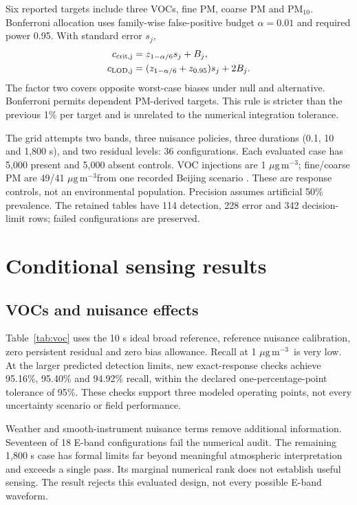 \documentclass[conference]{IEEEtran}
\newcommand{\ugm}{\ensuremath{\mu\mathrm{g\,m}^{-3}}}
\begin{document}
Six reported targets include three VOCs, fine PM, coarse PM and PM$_{10}$. Bonferroni allocation uses family-wise false-positive budget $\alpha=0.01$ and required power 0.95. With standard error $s_j$,
\begin{align}
c_{\rm crit,j}&=z_{1-\alpha/6}s_j+B_j,\\
c_{\rm LOD,j}&=(z_{1-\alpha/6}+z_{0.95})s_j+2B_j.
\end{align}
The factor two covers opposite worst-case biases under null and alternative. Bonferroni permits dependent PM-derived targets. This rule is stricter than the previous 1\% per target and is unrelated to the numerical integration tolerance.

The grid attempts two bands, three nuisance policies, three durations (0.1, 10 and 1,800 s), and two residual levels: 36 configurations. Each evaluated case has 5,000 present and 5,000 absent controls. VOC injections are 1 \ugm; fine/coarse PM are 49/41 \ugm from one recorded Beijing scenario \cite{beijing}. These are response controls, not an environmental population. Precision assumes artificial 50\% prevalence. The retained tables have 114 detection, 228 error and 342 decision-limit rows; failed configurations are preserved.

\section{Conditional sensing results}
\subsection{VOCs and nuisance effects}
Table~\ref{tab:voc} uses the 10 s ideal broad reference, reference nuisance calibration, zero persistent residual and zero bias allowance. Recall at 1 \ugm\ is very low. At the larger predicted detection limits, new exact-response checks achieve 95.16\%, 95.40\% and 94.92\% recall, within the declared one-percentage-point tolerance of 95\%. These checks support three modeled operating points, not every uncertainty scenario or field performance.

\begin{table}[t]\centering\scriptsize
\caption{Broad 10 s reference. LOD assumes 95\% power and 1\% family-wise false positives. Recall and RMSE use 1 \ugm\ injections. ppm uses 288.15 K and 101325 Pa.}
\setlength{\tabcolsep}{3pt}

\label{tab:voc}
\end{table}

Weather and smooth-instrument nuisance terms remove additional information. Seventeen of 18 E-band configurations fail the numerical audit. The remaining 1,800 s case has formal limits far beyond meaningful atmospheric interpretation and exceeds a single pass. Its marginal numerical rank does not establish useful sensing. The result rejects this evaluated design, not every possible E-band waveform.
\end{document}

